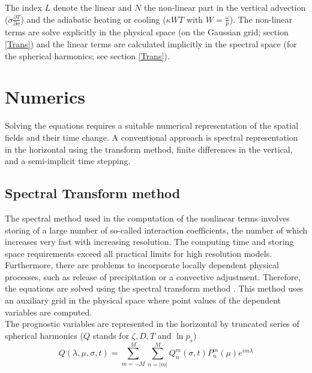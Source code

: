 
The index $L$ denote the linear and $N$ the non-linear part in  
the vertical advection ($\dot {\sigma} \frac{\partial T}{\partial \sigma}$) 
and the adiabatic
heating or cooling ($\kappa W T$ with $W= \frac {\omega} {p}$).
The non-linear terms are solve explicitly in the physical space (on the
Gaussian grid; section \ref{Trans}) and the linear terms
are calculated implicitly in the spectral space (for the spherical harmonics; 
see section \ref{Trans}).



\section{Numerics \label{Num}}

Solving the equations requires a suitable numerical representation of the 
spatial fields and their time change. A conventional approach is 
spectral representation in the horizontal using the
transform method, finite differences in the vertical, 
and a semi-implicit time stepping. 
 

\subsection{Spectral Transform method \label{Trans}}
The spectral method used in the computation of the nonlinear terms 
involves storing of a large number of so-called
interaction coefficients, the number of which
increases very fast with increasing resolution.
The computing time and storing
space requirements exceed all practical limits for high
resolution models. Furthermore, there are problems to incorporate 
locally dependent physical
processes, such as release of precipitation or a convective 
adjustment.
Therefore, the equations are solved using the spectral 
transform method \cite{orszag1970, eliassen1970}. 
This method uses an auxiliary grid in the physical space
where point values of the dependent variables are computed.\\


The prognostic variables are represented in the horizontal by truncated series of spherical harmonics
($Q$ stands for $\zeta, D,T$ and $ \ln p_s$)
\begin{equation}
{\displaystyle Q(\lambda , \mu , \sigma , t) = \sum_{m = - M}^{M} \sum_{n =
    |m|}^{M} Q_n^m (\sigma , t) P_n^m (\mu) e ^{im\lambda} }
\end{equation}

